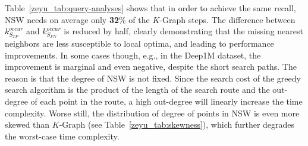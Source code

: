 \documentclass[11pt]{article}
\begin{document}
Table~\ref{zeyu_tab:query-analyses} shows that in order to achieve the same recall, NSW needs on average only \textbf{32}\% of the $K$-Graph steps.
The difference between $k^{occur}_{S_{TP}}$ and $k^{occur}_{S_{FN}}$ is reduced by half, clearly demonstrating that the missing nearest neighbors are less susceptible to local optima, and leading to performance improvements. %
In some cases though, e.g., in the Deep1M dataset, the improvement is marginal and even negative, despite the short search paths.
The reason is that the degree of NSW is not fixed.
Since the search cost of the greedy search algorithm is the product of the length of the search route and the out-degree of each point in the route, a high out-degree will linearly increase the time complexity.
Worse still, the distribution of degree of points in NSW is even more skewed than $K$-Graph (see Table~\ref{zeyu_tab:skewness}), which further degrades the worst-case time complexity.


\end{document}
